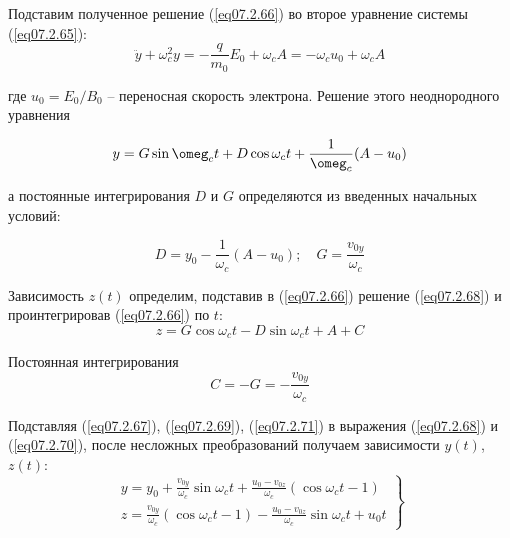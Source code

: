 Подставим полученное решение (\ref{eq07.2.66}) во второе уравнение системы 
(\ref{eq07.2.65}):
\[
	\ddot{y} + \omega^2_c y = -\frac{q}{m_0} E_0 + \omega_c A = 
		-\omega_c u_0 + \omega_c A
\]

где \( u_0 = E_0 / B_0 \) -- переносная скорость электрона. Решение этого 
неоднородного уравнения

\begin{equation}
	y = G\sin\omeg_c t + D\cos\omega_c t + \frac{1}{\omeg_c}( A - u_0 )
	\label{eq07.2.68}
\end{equation}

а постоянные интегрирования \( D \) и \( G \) определяются из введенных 
начальных условий:

\begin{equation}
	D = y_0 - \frac{1}{\omega_c}( A - u_0 ); \quad
	G = \frac{v_{0y}}{\omega_c}
	\label{eq07.2.69}
\end{equation}

Зависимость \( z(t) \) определим, подставив в (\ref{eq07.2.66}) решение 
(\ref{eq07.2.68}) и проинтегрировав (\ref{eq07.2.66}) по \( t \):
\begin{equation}
	z = G\cos\omega_c t - D\sin\omega_c t + A + C
	\label{eq07.2.70}
\end{equation}

Постоянная интегрирования
\begin{equation}
	C = -G = -\frac{v_{0y}}{\omega_c}
	\label{eq07.2.71}
\end{equation}

Подставляя (\ref{eq07.2.67}), (\ref{eq07.2.69}), (\ref{eq07.2.71}) в выражения 
(\ref{eq07.2.68}) и (\ref{eq07.2.70}), после несложных преобразований 
получаем зависимости \( y(t) \), \( z(t) \):
\begin{equation}
	\left. \begin{array}{c}
		y = y_0 + \frac{v_{0y}}{\omega_c}\sin\omega_c t +
			\frac{u_0-v_{0z}}{\omega_c}(\cos\omega_c t - 1) \\
		z = \frac{v_{0y}}{\omega_c}(\cos\omega_c t - 1 ) - 
			\frac{u_0-v_{0z}}{\omega_c}\sin\omega_c t + u_0 t
	\end{array} \right\}
	\label{eq07.2.72}
\end{equation}

